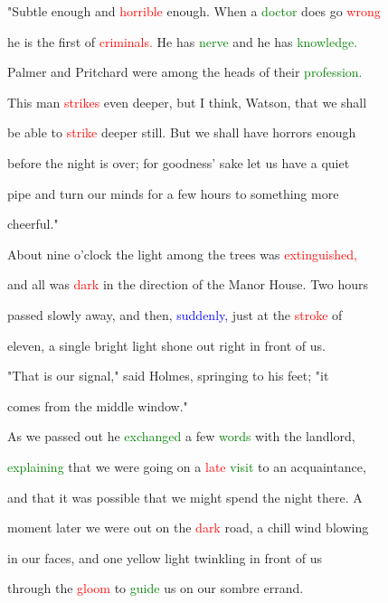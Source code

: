  "Subtle enough and \textcolor{red}{horrible} enough. When a \textcolor{green}{doctor} does go \textcolor{red}{wrong}

 he is the first of \textcolor{red}{criminals.} He has \textcolor{green}{nerve} and he has \textcolor{green}{knowledge.}

 Palmer and Pritchard were among the heads of their \textcolor{green}{profession.}

 This man \textcolor{red}{strikes} even deeper, but I think, Watson, that we shall

 be able to \textcolor{red}{strike} deeper still. But we shall have \textcolor{BurntOrange}{horrors} enough

 before the night is over; for \textcolor{BurntOrange}{goodness'} sake let us have a \textcolor{BurntOrange}{quiet}

 pipe and turn our minds for a few hours to something more

 \textcolor{BurntOrange}{cheerful."}





 About nine o'clock the light among the \textcolor{BurntOrange}{trees} was \textcolor{red}{extinguished,}

 and all was \textcolor{red}{dark} in the direction of the Manor House. Two hours

 passed slowly away, and then, \textcolor{blue}{suddenly,} just at the \textcolor{red}{stroke} of

 eleven, a single bright light shone out right in front of us.



 "That is our signal," said Holmes, springing to his feet; "it

 comes from the middle window."



 As we passed out he \textcolor{green}{exchanged} a few \textcolor{green}{words} with the landlord,

 \textcolor{green}{explaining} that we were going on a \textcolor{red}{late} \textcolor{green}{visit} to an acquaintance,

 and that it was possible that we might spend the night there. A

 moment later we were out on the \textcolor{red}{dark} road, a chill wind blowing

 in our faces, and one yellow light \textcolor{BurntOrange}{twinkling} in front of us

 through the \textcolor{red}{gloom} to \textcolor{green}{guide} us on our sombre \textcolor{BurntOrange}{errand.}



